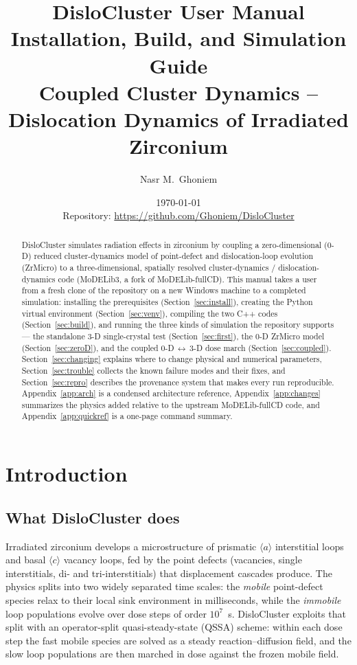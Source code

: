 \documentclass[11pt]{article}
\title{\textbf{DisloCluster User Manual}\\[6pt]
\large Installation, Build, and Simulation Guide\\
\large Coupled Cluster Dynamics -- Dislocation Dynamics of Irradiated Zirconium}
\author{Nasr M.\ Ghoniem}
\date{\today\\[4pt]\normalsize Repository: \url{https://github.com/Ghoniem/DisloCluster}}
\newcommand{\aloop}{\ensuremath{\langle a\rangle}}
\newcommand{\cloop}{\ensuremath{\langle c\rangle}}
\newcommand{\ZrM}{\textsf{ZrMicro}}
\newcommand{\MoD}{\textsf{MoDELib3}}
\newcommand{\DC}{\textsf{DisloCluster}}
\begin{document}
\maketitle

\begin{abstract}
\noindent
\DC{} simulates radiation effects in zirconium by coupling a zero-dimensional
(0-D) reduced cluster-dynamics model of point-defect and dislocation-loop
evolution (\ZrM{}) to a three-dimensional, spatially resolved
cluster-dynamics / dislocation-dynamics code (\MoD{}, a fork of
MoDELib-fullCD). This manual takes a user from a fresh clone of the repository
on a new Windows machine to a completed simulation: installing the
prerequisites (Section~\ref{sec:install}), creating the Python virtual
environment (Section~\ref{sec:venv}), compiling the two C++ codes
(Section~\ref{sec:build}), and running the three kinds of simulation the
repository supports --- the standalone 3-D single-crystal test
(Section~\ref{sec:first}), the 0-D \ZrM{} model (Section~\ref{sec:zeroD}),
and the coupled 0-D$\,\leftrightarrow\,$3-D dose march
(Section~\ref{sec:coupled}). Section~\ref{sec:changing} explains where to
change physical and numerical parameters, Section~\ref{sec:trouble} collects
the known failure modes and their fixes, and Section~\ref{sec:repro}
describes the provenance system that makes every run reproducible.
Appendix~\ref{app:arch} is a condensed architecture reference,
Appendix~\ref{app:changes} summarizes the physics added relative to the
upstream MoDELib-fullCD code, and Appendix~\ref{app:quickref} is a one-page
command summary.
\end{abstract}

\tableofcontents
\clearpage

\section{Introduction}
\label{sec:intro}

\subsection{What \DC{} does}

Irradiated zirconium develops a microstructure of prismatic \aloop{}
interstitial loops and basal \cloop{} vacancy loops, fed by the point defects
(vacancies, single interstitials, di- and tri-interstitials) that displacement
cascades produce. The physics splits into two widely separated time scales:
the \emph{mobile} point-defect species relax to their local sink environment
in milliseconds, while the \emph{immobile} loop populations evolve over dose
steps of order $10^{7}$~s. \DC{} exploits that split with an operator-split
quasi-steady-state (QSSA) scheme: within each dose step the fast mobile
species are solved as a steady reaction--diffusion field, and the slow loop
populations are then marched in dose against the frozen mobile field.
\end{document}
